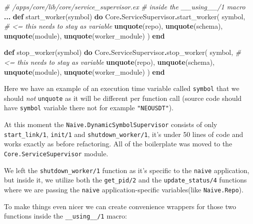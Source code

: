 \documentclass[
  oneside]{book}
\newenvironment{Shaded}{\begin{snugshade}}{\end{snugshade}}
\newcommand{\CommentTok}[1]{\textcolor[rgb]{0.56,0.35,0.01}{\textit{#1}}}
\newcommand{\ConstantTok}[1]{\textcolor[rgb]{0.00,0.00,0.00}{#1}}
\newcommand{\KeywordTok}[1]{\textcolor[rgb]{0.13,0.29,0.53}{\textbf{#1}}}
\newcommand{\NormalTok}[1]{#1}
\newcommand{\OperatorTok}[1]{\textcolor[rgb]{0.81,0.36,0.00}{\textbf{#1}}}
\begin{document}
\begin{Shaded}
\begin{Highlighting}[]
      \CommentTok{\# /apps/core/lib/core/service\_supervisor.ex}
      \CommentTok{\# inside the \_\_using\_\_/1 macro}
      \OperatorTok{...}
      \KeywordTok{def}\NormalTok{ start\_worker(symbol) }\KeywordTok{do}
        \ConstantTok{Core}\OperatorTok{.}\ConstantTok{ServiceSupervisor}\OperatorTok{.}\NormalTok{start\_worker(}
\NormalTok{          symbol, }\CommentTok{\# \textless{}= this needs to stay as variable}
          \KeywordTok{unquote}\NormalTok{(repo),}
          \KeywordTok{unquote}\NormalTok{(schema),}
          \KeywordTok{unquote}\NormalTok{(module), }
          \KeywordTok{unquote}\NormalTok{(worker\_module)}
\NormalTok{        )}
      \KeywordTok{end}

      \KeywordTok{def}\NormalTok{ stop\_worker(symbol) }\KeywordTok{do}
        \ConstantTok{Core}\OperatorTok{.}\ConstantTok{ServiceSupervisor}\OperatorTok{.}\NormalTok{stop\_worker(}
\NormalTok{          symbol, }\CommentTok{\# \textless{}= this needs to stay as variable}
          \KeywordTok{unquote}\NormalTok{(repo),}
          \KeywordTok{unquote}\NormalTok{(schema),}
          \KeywordTok{unquote}\NormalTok{(module),}
          \KeywordTok{unquote}\NormalTok{(worker\_module)}
\NormalTok{        )}
      \KeywordTok{end}
\end{Highlighting}
\end{Shaded}

Here we have an example of an execution time variable called \texttt{symbol} that we should \emph{not} \texttt{unquote} as it will be different per function call (source code should have \texttt{symbol} variable there not for example \texttt{"NEOUSDT"}).

At this moment the \texttt{Naive.DynamicSymbolSupervisor} consists of only \texttt{start\_link/1}, \texttt{init/1} and \texttt{shutdown\_worker/1}, it's under 50 lines of code and works exactly as before refactoring. All of the boilerplate was moved to the \texttt{Core.ServiceSupervisor} module.

We left the \texttt{shutdown\_worker/1} function as it's specific to the \texttt{naive} application, but inside it, we utilize both the \texttt{get\_pid/2} and the \texttt{update\_status/4} functions where we are passing the \texttt{naive} application-specific variables(like \texttt{Naive.Repo}).

To make things even nicer we can create convenience wrappers for those two functions inside the \texttt{\_\_using\_\_/1} macro:
\end{document}
